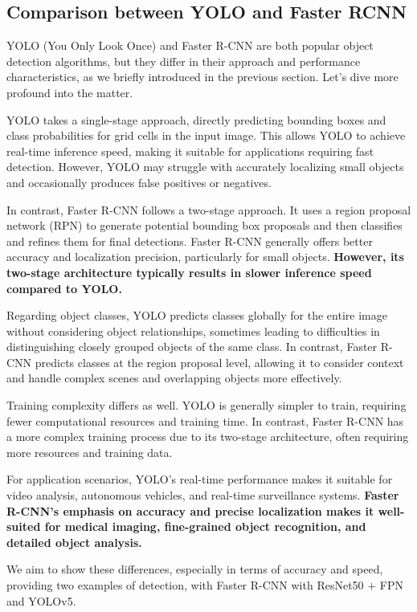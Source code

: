 \subsection{Comparison between YOLO and Faster RCNN}
YOLO (You Only Look Once) and Faster R-CNN are both popular object detection algorithms, but they differ in their approach and performance characteristics, as we briefly introduced in the previous section. Let's dive more profound into the matter.

YOLO takes a single-stage approach, directly predicting bounding boxes and class probabilities for grid cells in the input image. This allows YOLO to achieve real-time inference speed, making it suitable for applications requiring fast detection. However, YOLO may struggle with accurately localizing small objects and occasionally produces false positives or negatives.

In contrast, Faster R-CNN follows a two-stage approach. It uses a region proposal network (RPN) to generate potential bounding box proposals and then classifies and refines them for final detections. Faster R-CNN generally offers better accuracy and localization precision, particularly for small objects. \textbf{However, its two-stage architecture typically results in slower inference speed compared to YOLO.}

Regarding object classes, YOLO predicts classes globally for the entire image without considering object relationships, sometimes leading to difficulties in distinguishing closely grouped objects of the same class. In contrast, Faster R-CNN predicts classes at the region proposal level, allowing it to consider context and handle complex scenes and overlapping objects more effectively.

Training complexity differs as well. YOLO is generally simpler to train, requiring fewer computational resources and training time. In contrast, Faster R-CNN has a more complex training process due to its two-stage architecture, often requiring more resources and training data.

For application scenarios, YOLO's real-time performance makes it suitable for video analysis, autonomous vehicles, and real-time surveillance systems. \textbf{Faster R-CNN's emphasis on accuracy and precise localization makes it well-suited for medical imaging, fine-grained object recognition, and detailed object analysis.}

We aim to show these differences, especially in terms of accuracy and speed, providing two examples of detection, with Faster R-CNN with ResNet50 $+$ FPN and YOLOv5.

